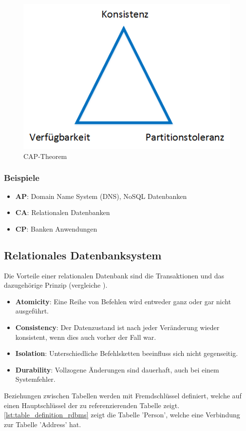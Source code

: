 \begin{figure}[h]
\centering
\includegraphics[scale=0.8]{images/visio/cap.png}
\caption[CAP-Theorem]{CAP-Theorem \selfmade{}}
\label{fig:cap}
\end{figure}

\subsubsection{Beispiele}

\begin{itemize}
	\item \textbf{AP}: Domain Name System (DNS), NoSQL Datenbanken
	\item \textbf{CA}: Relationalen Datenbanken
	\item \textbf{CP}: Banken Anwendungen
\end{itemize}

\subsection{Relationales Datenbanksystem}\label{rdbms}
Die Vorteile einer relationalen Datenbank sind die Transaktionen und das dazugehörige  Prinzip 
(vergleiche \cite{limited2010introduction}). 
\begin{itemize}
	\item \textbf{Atomicity}: Eine Reihe von Befehlen wird entweder ganz oder gar nicht ausgeführt.
	\item \textbf{Consistency}: Der Datenzustand ist nach jeder Veränderung wieder konsistent, wenn dies auch vorher der Fall war.
	\item \textbf{Isolation}: Unterschiedliche Befehlsketten beeinfluss sich nicht gegenseitig.
	\item \textbf{Durability}: Vollzogene Änderungen sind dauerhaft, auch bei einem Systemfehler.
\end{itemize}
Beziehungen zwischen Tabellen werden mit Fremdschlüssel definiert, welche auf einen Hauptschlüssel der zu referenzierenden Tabelle zeigt. \autoref{lst:table_definition_rdbms} zeigt die
Tabelle 'Person', welche eine Verbindung zur Tabelle 'Address' hat.


